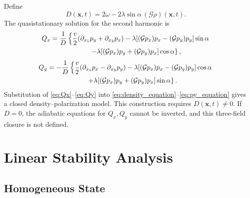 \documentclass[11pt]{article}
\numberwithin{equation}{section}
\begin{document}
Define
\begin{equation}
  D(\mathbf x,t)=
  2\omega-2\lambda\sin\alpha\,(\mathcal G\rho)(\mathbf x,t).
\end{equation}
The quasistationary solution for the second harmonic is
\begin{align}
  Q_x&=
  \frac{1}{D}
  \left\{
  \frac{v}{2}(\partial_{x_1}p_y+\partial_{x_2}p_x)
  -\lambda[(\mathcal Gp_x)p_x-(\mathcal Gp_y)p_y]\sin\alpha \right. \nonumber\\
  &\hspace{5.8em}\left.
  -\lambda[(\mathcal Gp_x)p_y+(\mathcal Gp_y)p_x]\cos\alpha
  \right\},
  \label{eq:Qx}
\end{align}
\begin{align}
  Q_y&=
  -\frac{1}{D}
  \left\{
  \frac{v}{2}(\partial_{x_1}p_x-\partial_{x_2}p_y)
  -\lambda[(\mathcal Gp_x)p_x-(\mathcal Gp_y)p_y]\cos\alpha \right. \nonumber\\
  &\hspace{5.8em}\left.
  +\lambda[(\mathcal Gp_x)p_y+(\mathcal Gp_y)p_x]\sin\alpha
  \right\}.
  \label{eq:Qy}
\end{align}
Substitution of \eqref{eq:Qx}--\eqref{eq:Qy} into
\eqref{eq:density_equation}--\eqref{eq:py_equation} gives a closed
density--polarization model. This construction requires
$D(\mathbf x,t)\ne0$. If $D=0$, the adiabatic equations for $Q_x,Q_y$
cannot be inverted, and this three-field closure is not defined.

\section{Linear Stability Analysis}

\subsection{Homogeneous State}
\end{document}
